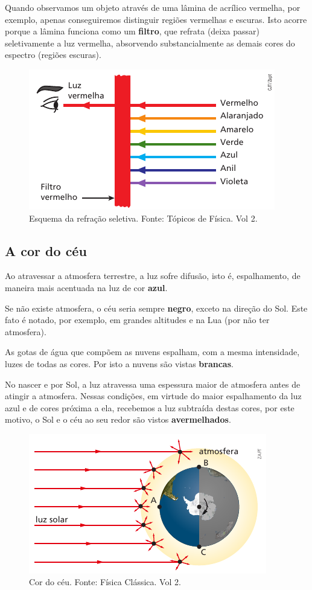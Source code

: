 \documentclass[11pt,twocolumn,oneside]{article}
\begin{document}
Quando observamos um objeto através de uma lâmina de acrílico vermelha, por exemplo, apenas conseguiremos distinguir regiões vermelhas e escuras. Isto acorre porque a lâmina funciona como um \textbf{filtro}, que refrata (deixa passar) seletivamente a luz vermelha, absorvendo substancialmente as demais cores do espectro (regiões escuras).


\begin{figure}[h]{}
\centering\includegraphics[width=2.5truein]{img13.png}
\caption{Esquema da refração seletiva. Fonte: Tópicos de Física. Vol 2.}
\centering
\end{figure}

\hypertarget{x-a-cor-do-céu}{\subsection{A cor do céu}}
Ao atravessar a atmosfera terrestre, a luz sofre difusão, isto é, espalhamento, de maneira mais acentuada na luz de cor \textbf{azul}.


Se não existe atmosfera, o céu seria sempre \textbf{negro}, exceto na direção do Sol. Este fato é notado, por exemplo, em grandes altitudes e na Lua (por não ter atmosfera).


As gotas de água que compõem as nuvens espalham, com a mesma intensidade, luzes de todas as cores. Por isto a nuvens são vistas \textbf{brancas}.


No nascer e por Sol, a luz atravessa uma espessura maior de atmosfera antes de atingir a atmosfera. Nessas condições, em virtude do maior espalhamento da luz azul e de cores próxima a ela, recebemos a luz subtraída destas cores, por este motivo, o Sol e o céu ao seu redor são vistos \textbf{avermelhados}.


\begin{figure}[h]{}
\centering\includegraphics[width=2.5truein]{img14.png}
\caption{Cor do céu. Fonte: Física Clássica. Vol 2.}
\centering
\end{figure}
\end{document}
